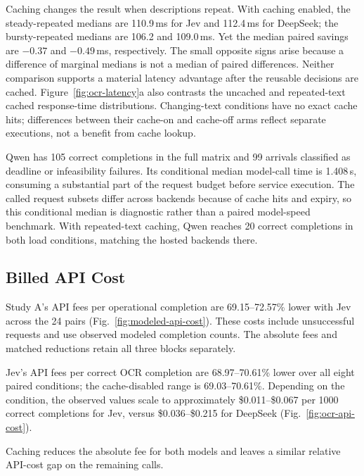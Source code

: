 Caching changes the result when descriptions repeat. With caching enabled,
the steady-repeated medians are 110.9\,ms for Jev and 112.4\,ms for DeepSeek;
the bursty-repeated medians are 106.2 and 109.0\,ms. Yet the median paired
savings are $-0.37$ and $-0.49$\,ms, respectively. The small opposite signs
arise because a difference of marginal medians is not a median of paired
differences. Neither comparison supports a material latency advantage after
the reusable decisions are cached. Figure~\ref{fig:ocr-latency}a also contrasts
the uncached and repeated-text cached response-time distributions. Changing-text conditions have no exact
cache hits; differences between their cache-on and cache-off arms reflect
separate executions, not a benefit from cache lookup.

Qwen has
105 correct completions in the full matrix and 99 arrivals classified as
deadline or infeasibility failures. Its conditional median model-call time
is 1.408\,s, consuming a substantial part of the request budget before
service execution.
The called request subsets differ across backends because of cache hits and
expiry, so this conditional median is diagnostic rather than a paired
model-speed benchmark. With repeated-text caching, Qwen reaches 20 correct
completions in both load conditions, matching the hosted backends there.

\subsection{Billed API Cost}

Study A's API fees per operational completion are 69.15--72.57\% lower
with Jev across the 24 pairs (Fig.~\ref{fig:modeled-api-cost}). These costs
include unsuccessful requests and use observed modeled completion counts.
The absolute fees and matched reductions retain all three blocks separately.


Jev's API fees per correct OCR completion are 68.97--70.61\% lower over all
eight paired conditions; the cache-disabled range is 69.03--70.61\%.
Depending on the condition, the observed values scale to approximately
\$0.011--\$0.067 per 1000 correct completions for Jev, versus
\$0.036--\$0.215 for DeepSeek (Fig.~\ref{fig:ocr-api-cost}).

Caching reduces the absolute fee for both models and leaves a similar
relative API-cost gap on the remaining calls.
